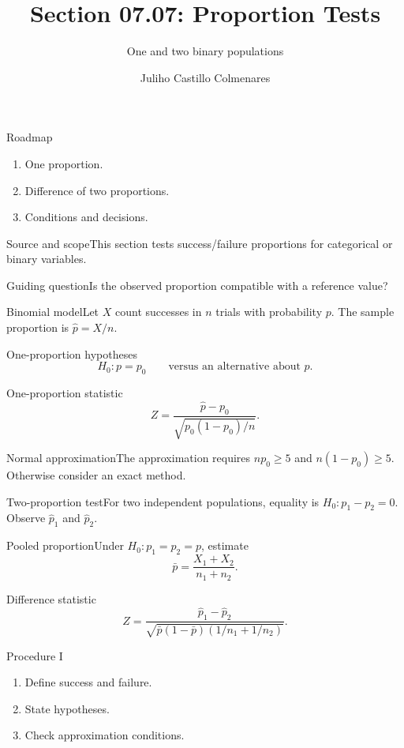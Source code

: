 \documentclass[10pt,aspectratio=169]{beamer}
\title{Section 07.07: Proportion Tests}\subtitle{One and two binary populations}
\author[J. Castillo Colmenares]{Juliho Castillo Colmenares}\institute{Tecnológico de Monterrey}\date{}
\begin{document}
\begin{frame}[plain]\titlepage\end{frame}
\begin{frame}{Roadmap}\small\begin{enumerate}\item One proportion.\item Difference of two proportions.\item Conditions and decisions.\end{enumerate}\end{frame}
\begin{frame}{Source and scope}\small This section tests success/failure proportions for categorical or binary variables.\begin{block}{Guiding question}Is the observed proportion compatible with a reference value?\end{block}\end{frame}
\begin{frame}{Binomial model}\small Let $X$ count successes in $n$ trials with probability $p$. The sample proportion is $\hat p=X/n$.\end{frame}
\begin{frame}{One-proportion hypotheses}\small\[H_0:p=p_0\qquad\text{versus an alternative about }p.\]\end{frame}
\begin{frame}{One-proportion statistic}\small\[Z=\frac{\hat p-p_0}{\sqrt{p_0(1-p_0)/n}}.\]\end{frame}
\begin{frame}{Normal approximation}\small The approximation requires $np_0\geq5$ and $n(1-p_0)\geq5$. Otherwise consider an exact method.\end{frame}
\begin{frame}{Two-proportion test}\small For two independent populations, equality is $H_0:p_1-p_2=0$. Observe $\hat p_1$ and $\hat p_2$.\end{frame}
\begin{frame}{Pooled proportion}\small Under $H_0:p_1=p_2=p$, estimate\[\bar p=\frac{X_1+X_2}{n_1+n_2}.\]\end{frame}
\begin{frame}{Difference statistic}\small\[Z=\frac{\hat p_1-\hat p_2}{\sqrt{\bar p(1-\bar p)(1/n_1+1/n_2)}}.\]\end{frame}
\begin{frame}{Procedure I}\small\begin{enumerate}\item Define success and failure.\item State hypotheses.\item Check approximation conditions.\end{enumerate}\end{frame}
\end{document}

